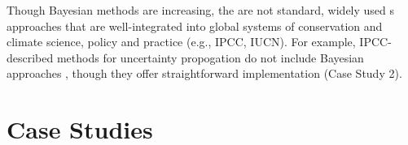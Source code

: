 \documentclass{article}
\begin{document}
\par  Though Bayesian methods are increasing, the are not standard, widely used s approaches that are well-integrated into global systems of conservation and climate science, policy and practice (e.g., IPCC, IUCN). For example, IPCC-described methods for uncertainty propogation do not include Bayesian approaches \citep{ipcc2007}, though they offer straightforward implementation (Case Study 2).
\section* {Case Studies}
\end{document}
